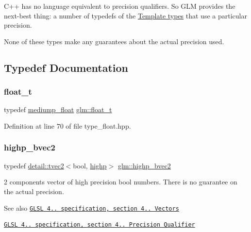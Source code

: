 C++ has no language equivalent to precision qualifiers. So G\+LM provides the next-\/best thing\+: a number of typedefs of the \hyperlink{group__core__template}{Template types} that use a particular precision.

None of these types make any guarantees about the actual precision used. 

\subsection{Typedef Documentation}
\mbox{\label{group__core__precision_gae01b87f81bd15327230bf1b47c482b24}} 
\subsubsection{\texorpdfstring{float\+\_\+t}{float\_t}}
{\footnotesize\ttfamily typedef \hyperlink{group__core__precision_gac785826c039fe6c97c03b37c81c1a68e}{mediump\+\_\+float} \hyperlink{group__core__precision_gae01b87f81bd15327230bf1b47c482b24}{glm\+::float\+\_\+t}}



Definition at line 70 of file type\+\_\+float.\+hpp.

\mbox{\label{group__core__precision_ga4153415d1f3d390219ac9464652ac377}} 
\subsubsection{\texorpdfstring{highp\+\_\+bvec2}{highp\_bvec2}}
{\footnotesize\ttfamily typedef \hyperlink{structglm_1_1detail_1_1tvec2}{detail\+::tvec2}$<$bool, \hyperlink{namespaceglm_a0f04f086094c747d227af4425893f545ac6f7eab42eacbb10d59a58e95e362074}{highp}$>$ \hyperlink{group__core__precision_ga4153415d1f3d390219ac9464652ac377}{glm\+::highp\+\_\+bvec2}}

2 components vector of high precision bool numbers. There is no guarantee on the actual precision.

\begin{DoxySeeAlso}{See also}
\href{http://www.opengl.org/registry/doc/GLSLangSpec.4.20.8.pdf}{\tt G\+L\+SL 4.. specification, section 4.. Vectors} 

\href{http://www.opengl.org/registry/doc/GLSLangSpec.4.20.8.pdf}{\tt G\+L\+SL 4.. specification, section 4.. Precision Qualifier} 
\end{DoxySeeAlso}


